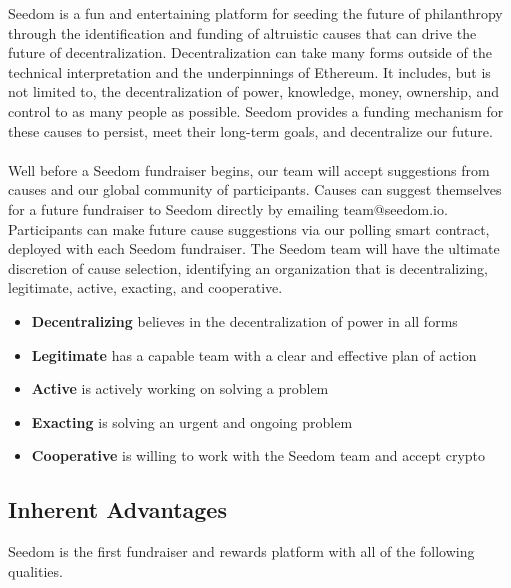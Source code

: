 \documentclass[11pt]{article}
\begin{document}
Seedom is a fun and entertaining platform for seeding the future of philanthropy through the identification and funding of altruistic causes that can drive the future of decentralization. Decentralization can take many forms outside of the technical interpretation and the underpinnings of Ethereum. It includes, but is not limited to, the decentralization of power, knowledge, money, ownership, and control to as many people as possible. Seedom provides a funding mechanism for these causes to persist, meet their long-term goals, and decentralize our future.\\\\
Well before a Seedom fundraiser begins, our team will accept suggestions from causes and our global community of participants. Causes can suggest themselves for a future fundraiser to Seedom directly by emailing team@seedom.io. Participants can make future cause suggestions via our polling smart contract, deployed with each Seedom fundraiser. The Seedom team will have the ultimate discretion of cause selection, identifying an organization that is decentralizing, legitimate, active, exacting, and cooperative.

\begin{itemize}
\item{\textbf{Decentralizing} believes in the decentralization of power in all forms}
\item{\textbf{Legitimate} has a capable team with a clear and effective plan of action}
\item{\textbf{Active} is actively working on solving a problem}
\item{\textbf{Exacting} is solving an urgent and ongoing problem}
\item{\textbf{Cooperative} is willing to work with the Seedom team and accept crypto}
\end{itemize}

\subsection{Inherent Advantages}

Seedom is the first fundraiser and rewards platform with all of the following qualities.
\end{document}
